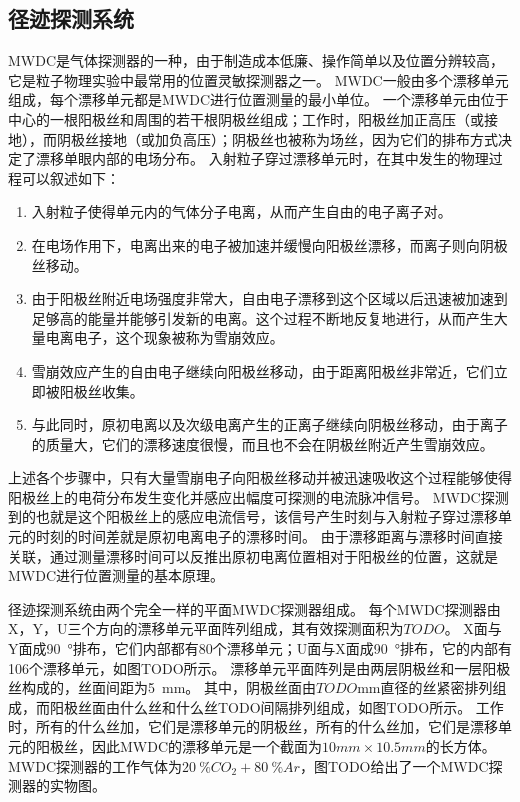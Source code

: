 \subsection{径迹探测系统}
\label{sec:cosmic_ray:tracking_system}
MWDC是气体探测器的一种，由于制造成本低廉、操作简单以及位置分辨较高，它是粒子物理实验中最常用的位置灵敏探测器之一。
MWDC一般由多个漂移单元组成，每个漂移单元都是MWDC进行位置测量的最小单位。
一个漂移单元由位于中心的一根阳极丝和周围的若干根阴极丝组成；工作时，阳极丝加正高压（或接地），而阴极丝接地（或加负高压）；阴极丝也被称为场丝，因为它们的排布方式决定了漂移单眼内部的电场分布。
入射粒子穿过漂移单元时，在其中发生的物理过程可以叙述如下：
\begin{enumerate}
	\item 入射粒子使得单元内的气体分子电离，从而产生自由的电子离子对。
	\item 在电场作用下，电离出来的电子被加速并缓慢向阳极丝漂移，而离子则向阴极丝移动。
	\item 由于阳极丝附近电场强度非常大，自由电子漂移到这个区域以后迅速被加速到足够高的能量并能够引发新的电离。这个过程不断地反复地进行，从而产生大量电离电子，这个现象被称为雪崩效应。
	\item 雪崩效应产生的自由电子继续向阳极丝移动，由于距离阳极丝非常近，它们立即被阳极丝收集。
	\item 与此同时，原初电离以及次级电离产生的正离子继续向阴极丝移动，由于离子的质量大，它们的漂移速度很慢，而且也不会在阴极丝附近产生雪崩效应。
\end{enumerate}
上述各个步骤中，只有大量雪崩电子向阳极丝移动并被迅速吸收这个过程能够使得阳极丝上的电荷分布发生变化并感应出幅度可探测的电流脉冲信号。
MWDC探测到的也就是这个阳极丝上的感应电流信号，该信号产生时刻与入射粒子穿过漂移单元的时刻的时间差就是原初电离电子的漂移时间。
由于漂移距离与漂移时间直接关联，通过测量漂移时间可以反推出原初电离位置相对于阳极丝的位置，这就是MWDC进行位置测量的基本原理。

径迹探测系统由两个完全一样的平面MWDC探测器组成。
每个MWDC探测器由X，Y，U三个方向的漂移单元平面阵列组成，其有效探测面积为$TODO$。
X面与Y面成\SI{90}{\degree}排布，它们内部都有80个漂移单元；U面与X面成\SI{90}{\degree}排布，它的内部有106个漂移单元，如图TODO所示。
漂移单元平面阵列是由两层阴极丝和一层阳极丝构成的，丝面间距为\SI{5}{mm}。
其中，阴极丝面由$TODO$mm直径的丝紧密排列组成，而阳极丝面由什么丝和什么丝TODO间隔排列组成，如图TODO所示。
工作时，所有的什么丝加，它们是漂移单元的阴极丝，所有的什么丝加，它们是漂移单元的阳极丝，因此MWDC的漂移单元是一个截面为$10mm\times 10.5mm$的长方体。
MWDC探测器的工作气体为$\SI{20}{\percent}CO_2 + \SI{80}{\percent}Ar$，图TODO给出了一个MWDC探测器的实物图。

